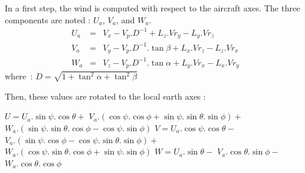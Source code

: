 In a first step, the wind is computed with respect to 
the aircraft axes. The three components are noted :
$U_a$, $V_a$, and $W_a$. 
\begin{eqnarray*}
U_a & = & V_x - V_p.D^{-1} + L_z . Vr_y - L_y . Vr_z\\
V_a & = & V_y - V_p.D^{-1}.\tan\beta + L_x.Vr_z - L_z.Vr_x\\
W_a & = & V_z - V_p.D^{-1}.\tan\alpha + L_y . Vr_x - L_x.Vr_y
\end{eqnarray*}
where~: $ D = \sqrt{1+\tan^2\alpha+\tan^2\beta}$

Then, these values are rotated to the local earth axes :

$U = U_a.\sin\psi.\cos\theta +$
        $V_a.(\cos\psi.\cos\phi+\sin\psi.\sin\theta.\sin\phi) +$
        $W_a.(\sin\psi.\sin\theta.\cos\phi - \cos\psi.\sin\phi)$ \newline
$V = U_a.\cos\psi.\cos\theta -$
        $V_a.(\sin\psi.\cos\phi - \cos\psi.\sin\theta.\sin\phi) +$
        $W_a.(\cos\psi.\sin\theta.\cos\phi + \sin\psi.\sin\phi)$ \newline
$W = U_a.\sin\theta -$ 
        $V_a.\cos\theta.\sin\phi -$
        $W_a.\cos\theta.\cos\phi$

